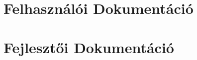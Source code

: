 \documentclass[twoside, a4paper, 12pt]{article}
\begin{document}
\newpage
\part{Felhasználói Dokumentáció}


















\newpage
\part{Fejlesztői Dokumentáció}
\end{document}
